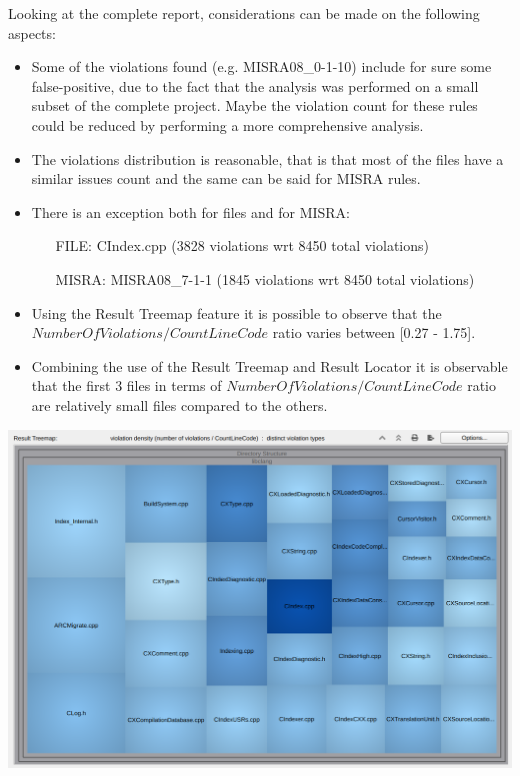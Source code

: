 Looking at the complete report, considerations can be made on the following aspects:

\begin{itemize}
	\item Some of the violations found (e.g. MISRA08\_0-1-10) include for sure some false-positive, due to the fact that the analysis was performed on a small subset of the complete project. Maybe the violation count for these rules could be reduced by performing a more comprehensive analysis.
	\item The violations distribution is reasonable, that is that most of the files have a similar issues count and the same can be said for MISRA rules.
	\item There is an exception both for files and for MISRA:
	\begin{itemize}
		\item[FILE: ] CIndex.cpp (3828 violations wrt 8450 total violations)
		\item[MISRA: ] MISRA08\_7-1-1 (1845 violations wrt 8450 total violations)
	\end{itemize}
	\item Using the Result Treemap feature it is possible to observe that the $NumberOfViolations/CountLineCode$ ratio varies between [0.27 - 1.75].
	\item Combining the use of the Result Treemap and Result Locator it is observable that the first 3 files in terms of $NumberOfViolations/CountLineCode$ ratio are relatively small files compared to the others.
	
\end{itemize}

\vspace{1cm}

\begin{minipage}{\linewidth}
	\includegraphics[width=\textwidth]{img/TreemapCountLine.png}
\end{minipage}


